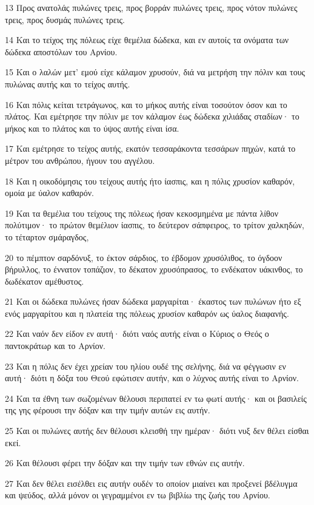 \par 13 Προς ανατολάς πυλώνες τρεις, προς βορράν πυλώνες τρεις, προς νότον πυλώνες τρεις, προς δυσμάς πυλώνες τρεις.
\par 14 Και το τείχος της πόλεως είχε θεμέλια δώδεκα, και εν αυτοίς τα ονόματα των δώδεκα αποστόλων του Αρνίου.
\par 15 Και ο λαλών μετ' εμού είχε κάλαμον χρυσούν, διά να μετρήση την πόλιν και τους πυλώνας αυτής και το τείχος αυτής.
\par 16 Και πόλις κείται τετράγωνος, και το μήκος αυτής είναι τοσούτον όσον και το πλάτος. Και εμέτρησε την πόλιν με τον κάλαμον έως δώδεκα χιλιάδας σταδίων· το μήκος και το πλάτος και το ύψος αυτής είναι ίσα.
\par 17 Και εμέτρησε το τείχος αυτής, εκατόν τεσσαράκοντα τεσσάρων πηχών, κατά το μέτρον του ανθρώπου, ήγουν του αγγέλου.
\par 18 Και η οικοδόμησις του τείχους αυτής ήτο ίασπις, και η πόλις χρυσίον καθαρόν, ομοία με ύαλον καθαρόν.
\par 19 Και τα θεμέλια του τείχους της πόλεως ήσαν κεκοσμημένα με πάντα λίθον πολύτιμον· το πρώτον θεμέλιον ίασπις, το δεύτερον σάπφειρος, το τρίτον χαλκηδών, το τέταρτον σμάραγδος,
\par 20 το πέμπτον σαρδόνυξ, το έκτον σάρδιος, το έβδομον χρυσόλιθος, το όγδοον βήρυλλος, το έννατον τοπάζιον, το δέκατον χρυσόπρασος, το ενδέκατον υάκινθος, το δωδέκατον αμέθυστος.
\par 21 Και οι δώδεκα πυλώνες ήσαν δώδεκα μαργαρίται· έκαστος των πυλώνων ήτο εξ ενός μαργαρίτου και η πλατεία της πόλεως χρυσίον καθαρόν ως ύαλος διαφανής.
\par 22 Και ναόν δεν είδον εν αυτή· διότι ναός αυτής είναι ο Κύριος ο Θεός ο παντοκράτωρ και το Αρνίον.
\par 23 Και η πόλις δεν έχει χρείαν του ηλίου ουδέ της σελήνης, διά να φέγγωσιν εν αυτή· διότι η δόξα του Θεού εφώτισεν αυτήν, και ο λύχνος αυτής είναι το Αρνίον.
\par 24 Και τα έθνη των σωζομένων θέλουσι περιπατεί εν τω φωτί αυτής· και οι βασιλείς της γης φέρουσι την δόξαν και την τιμήν αυτών εις αυτήν.
\par 25 Και οι πυλώνες αυτής δεν θέλουσι κλεισθή την ημέραν· διότι νυξ δεν θέλει είσθαι εκεί.
\par 26 Και θέλουσι φέρει την δόξαν και την τιμήν των εθνών εις αυτήν.
\par 27 Και δεν θέλει εισέλθει εις αυτήν ουδέν το οποίον μιαίνει και προξενεί βδέλυγμα και ψεύδος, αλλά μόνον οι γεγραμμένοι εν τω βιβλίω της ζωής του Αρνίου.

